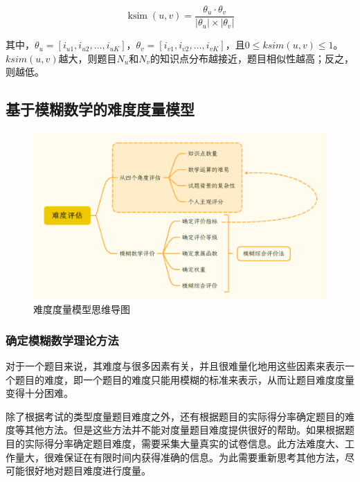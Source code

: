 \begin{equation}
\label{equation042004}
\operatorname{ksim}(u, v)=\frac{\theta_{u} \cdot \theta_{v}}{\left|\theta_{u}\right| \times\left|\theta_{v}\right|}
\end{equation}

其中，$\theta_{u} = \left [ i_{u1},i_{u2}, \dots, i_{uK} \right ] $，$\theta_{v} = \left [ i_{v1},i_{v2}, \dots, i_{vK} \right ] $，且$0 \le ksim(u,v) \le 1$。$ksim(u,v)$越大，则题目$N_{u}$和$N_{v}$的知识点分布越接近，题目相似性越高；反之，则越低。

\subsection{基于模糊数学的难度度量模型}

\begin{figure}[h]
    \centering
    \includegraphics[scale=0.3]{res/figure040041.png}
    \caption{难度度量模型思维导图}
\end{figure}

\subsubsection{确定模糊数学理论方法}

对于一个题目来说，其难度与很多因素有关，并且很难量化地用这些因素来表示一个题目的难度，即一个题目的难度只能用模糊的标准来表示，从而让题目难度度量变得十分困难。

除了根据考试的类型度量题目难度之外，还有根据题目的实际得分率确定题目的难度等其他方法。但是这些方法并不能对度量题目难度提供很好的帮助。如果根据题目的实际得分率确定题目难度，需要采集大量真实的试卷信息。此方法难度大、工作量大，很难保证在有限时间内获得准确的信息。为此需要重新思考其他方法，尽可能很好地对题目难度进行度量。

